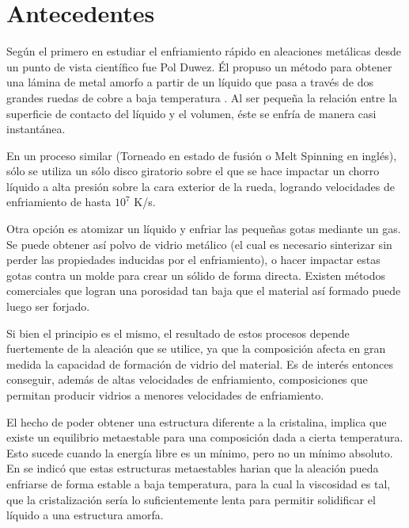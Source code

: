
\section{Antecedentes}
\label{S1_2}

Según \citep{liebermann93} el primero en estudiar el enfriamiento rápido en aleaciones metálicas desde un punto de vista científico fue Pol Duwez. Él propuso un método para obtener una lámina de metal amorfo a partir de un líquido que pasa a través de dos grandes ruedas de cobre a baja temperatura \citep{duwez60}. Al ser pequeña la relación entre la superficie de contacto del líquido y el volumen, éste se enfría de manera casi instantánea.

En un proceso similar (Torneado en estado de fusión o Melt Spinning en inglés), sólo se utiliza un sólo disco giratorio sobre el que se hace impactar un chorro líquido a alta presión sobre la cara exterior de la rueda, logrando velocidades de enfriamiento de hasta $10^{7}$ K/s.

Otra opción es atomizar un líquido y enfriar las pequeñas gotas mediante un gas. Se puede obtener así polvo de vidrio metálico (el cual es necesario sinterizar sin perder las propiedades inducidas por el enfriamiento), o hacer impactar estas gotas contra un molde para crear un sólido de forma directa. Existen métodos comerciales que logran una porosidad tan baja que el material así formado puede luego ser forjado.

Si bien el principio es el mismo, el resultado de estos procesos depende fuertemente de la aleación que se utilice, ya que la composición afecta en gran medida la capacidad de formación de vidrio del material. Es de interés entonces conseguir, además de altas velocidades de enfriamiento, composiciones que permitan producir vidrios a menores velocidades de enfriamiento.

El hecho de poder obtener una estructura diferente a la cristalina, implica que existe un equilibrio metaestable para una composición dada a cierta temperatura. Esto sucede cuando la energía libre es un mínimo, pero no un mínimo absoluto. En \citep{cohen61} se indicó que estas estructuras metaestables harian que la aleación pueda enfriarse de forma estable a baja temperatura, para la cual la viscosidad es tal, que la cristalización sería lo suficientemente lenta para permitir solidificar el líquido a una estructura amorfa.

